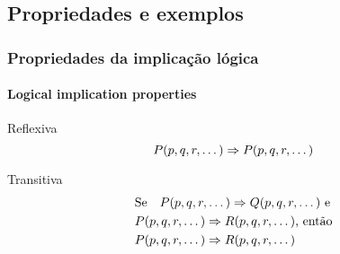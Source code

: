 \subsection{Propriedades e exemplos}
%
\begin{frame}[t]
    \frametitle{Propriedades da implicação lógica}
    \framesubtitle{Logical implication properties}
    \begin{block}{\centering Reflexiva}
        \begin{equation}
            P(p,q,r,\dots) \Rightarrow P(p,q,r,\dots)
        \end{equation}
    \end{block}
    \begin{block}{\centering Transitiva}
        \vspace{-4mm}
        \begin{align}
            &\text{Se\quad} P(p,q,r,\dots) \Rightarrow Q(p,q,r,\dots) \text{ e}\\ \nonumber
            &P(p,q,r,\dots) \Rightarrow R(p,q,r,\dots) \text{, então} \\
            &P(p,q,r,\dots) \Rightarrow R(p,q,r,\dots)
        \end{align}
    \end{block}
\end{frame}
%
